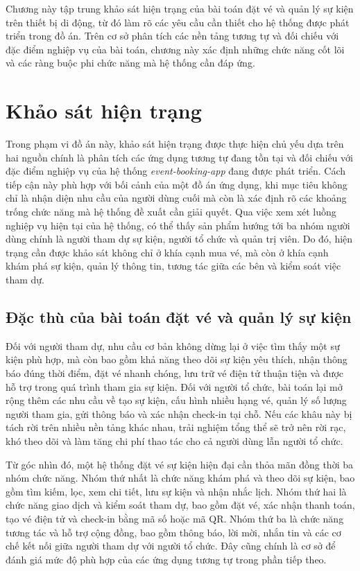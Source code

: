 \documentclass[../DoAn.tex]{subfiles}
\begin{document}
Chương này tập trung khảo sát hiện trạng của bài toán đặt vé và quản lý sự kiện trên thiết bị di động, từ đó làm rõ các yêu cầu cần thiết cho hệ thống được phát triển trong đồ án. Trên cơ sở phân tích các nền tảng tương tự và đối chiếu với đặc điểm nghiệp vụ của bài toán, chương này xác định những chức năng cốt lõi và các ràng buộc phi chức năng mà hệ thống cần đáp ứng. 

\section{Khảo sát hiện trạng}
\label{section:2.1}
Trong phạm vi đồ án này, khảo sát hiện trạng được thực hiện chủ yếu dựa trên hai nguồn chính là phân tích các ứng dụng tương tự đang tồn tại và đối chiếu với đặc điểm nghiệp vụ của hệ thống \textit{event-booking-app} đang được phát triển. Cách tiếp cận này phù hợp với bối cảnh của một đồ án ứng dụng, khi mục tiêu không chỉ là nhận diện nhu cầu của người dùng cuối mà còn là xác định rõ các khoảng trống chức năng mà hệ thống đề xuất cần giải quyết. Qua việc xem xét luồng nghiệp vụ hiện tại của hệ thống, có thể thấy sản phẩm hướng tới ba nhóm người dùng chính là người tham dự sự kiện, người tổ chức và quản trị viên. Do đó, hiện trạng cần được khảo sát không chỉ ở khía cạnh mua vé, mà còn ở khía cạnh khám phá sự kiện, quản lý thông tin, tương tác giữa các bên và kiểm soát việc tham dự.

\subsection{Đặc thù của bài toán đặt vé và quản lý sự kiện}
Đối với người tham dự, nhu cầu cơ bản không dừng lại ở việc tìm thấy một sự kiện phù hợp, mà còn bao gồm khả năng theo dõi sự kiện yêu thích, nhận thông báo đúng thời điểm, đặt vé nhanh chóng, lưu trữ vé điện tử thuận tiện và được hỗ trợ trong quá trình tham gia sự kiện. Đối với người tổ chức, bài toán lại mở rộng thêm các nhu cầu về tạo sự kiện, cấu hình nhiều hạng vé, quản lý số lượng người tham gia, gửi thông báo và xác nhận check-in tại chỗ. Nếu các khâu này bị tách rời trên nhiều nền tảng khác nhau, trải nghiệm tổng thể sẽ trở nên rời rạc, khó theo dõi và làm tăng chi phí thao tác cho cả người dùng lẫn người tổ chức.

Từ góc nhìn đó, một hệ thống đặt vé sự kiện hiện đại cần thỏa mãn đồng thời ba nhóm chức năng. Nhóm thứ nhất là chức năng khám phá và theo dõi sự kiện, bao gồm tìm kiếm, lọc, xem chi tiết, lưu sự kiện và nhận nhắc lịch. Nhóm thứ hai là chức năng giao dịch và kiểm soát tham dự, bao gồm đặt vé, xác nhận thanh toán, tạo vé điện tử và check-in bằng mã số hoặc mã \gls{QR}. Nhóm thứ ba là chức năng tương tác và hỗ trợ cộng đồng, bao gồm thông báo, lời mời, nhắn tin và các cơ chế kết nối giữa người tham dự với người tổ chức. Đây cũng chính là cơ sở để đánh giá mức độ phù hợp của các ứng dụng tương tự trong phần tiếp theo.
\end{document}

